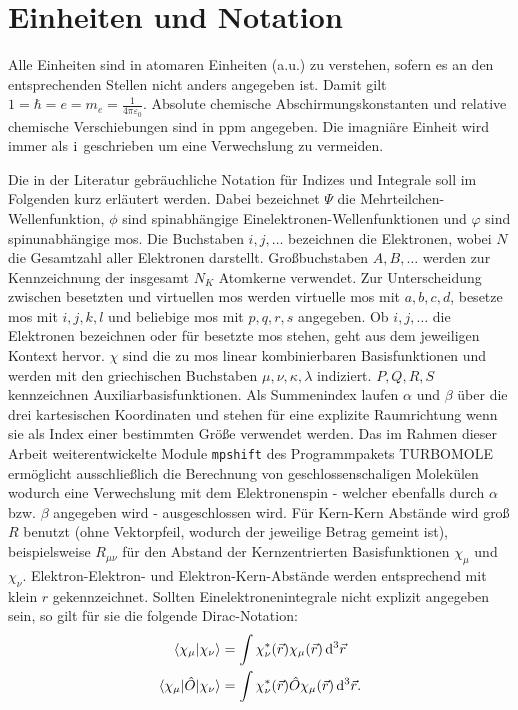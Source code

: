 \section{Einheiten und Notation}

Alle Einheiten sind in atomaren Einheiten (a.u.) zu verstehen, sofern es an den entsprechenden Stellen nicht anders angegeben ist. Damit gilt $1=\hbar=e=m_e=\frac{1}{4\pi\varepsilon_0}$.
Absolute chemische Abschirmungskonstanten und relative chemische Verschiebungen sind in \unit{ppm} angegeben. Die imagniäre Einheit wird immer als $\mathrm{i}\mkern1mu$ geschrieben um eine Verwechslung zu vermeiden.
 
\bigskip
Die in der Literatur gebräuchliche Notation für Indizes und Integrale soll im Folgenden kurz erläutert werden. Dabei bezeichnet $\Psi$ die Mehrteilchen-Wellenfunktion, $\phi$ sind spinabhängige Einelektronen-Wellenfunktionen und $\varphi$ sind spinunabhängige \acp{mo}. Die Buchstaben $i,j,\dotsc$ bezeichnen die Elektronen, wobei $N$ die Gesamtzahl aller Elektronen darstellt. Großbuchstaben $A,B,\dotsc$ werden zur Kennzeichnung der insgesamt $N_K$ Atomkerne verwendet. Zur Unterscheidung zwischen besetzten und virtuellen \acp{mo} werden virtuelle \acp{mo} mit $a,b,c,d$, besetze \acp{mo} mit $i,j,k,l$ und beliebige \acp{mo} mit $p,q,r,s$ angegeben. Ob $i,j,\dotsc$ die Elektronen bezeichnen oder für besetzte \acp{mo} stehen, geht aus dem jeweiligen Kontext hervor. $\chi$ sind die zu \acp{mo} linear kombinierbaren Basisfunktionen und werden mit den griechischen Buchstaben $\mu,\nu,\kappa,\lambda$ indiziert. $P,Q,R,S$ kennzeichnen Auxiliarbasisfunktionen. Als Summenindex laufen $\alpha$ und $\beta$ über die drei kartesischen Koordinaten und stehen für eine explizite Raumrichtung wenn sie als Index einer bestimmten Größe verwendet werden. Das im Rahmen dieser Arbeit weiterentwickelte Module \texttt{mpshift} des Programmpakets \textsc{TURBOMOLE} ermöglicht ausschließlich die Berechnung von geschlossenschaligen Molekülen wodurch eine Verwechslung mit dem Elektronenspin - welcher ebenfalls durch $\alpha$ bzw. $\beta$ angegeben wird - ausgeschlossen wird. Für Kern-Kern Abstände wird groß $R$ benutzt (ohne Vektorpfeil, wodurch der jeweilige Betrag gemeint ist), beispielsweise $R_{\mu\nu}$ für den Abstand der Kernzentrierten Basisfunktionen $\chi_\mu$ und $\chi_\nu$. Elektron-Elektron- und Elektron-Kern-Abstände werden entsprechend mit klein $r$ gekennzeichnet.
\newpage
Sollten Einelektronenintegrale nicht explizit angegeben sein, so gilt für sie die folgende Dirac-Notation:
\begin{gather*}
	\langle\chi_\mu\vert\chi_\nu\rangle=\int\chi_\nu^*(\vec{r})\chi_\mu(\vec{r})\mathop{}\!\mathrm{d^3}\vec{r}\\
	\langle\chi_\mu\vert\hat O\vert\chi_\nu\rangle=\int\chi_\nu^*(\vec{r})\hat O\chi_\mu(\vec{r})\mathop{}\!\mathrm{d^3}\vec{r}.
\end{gather*}

